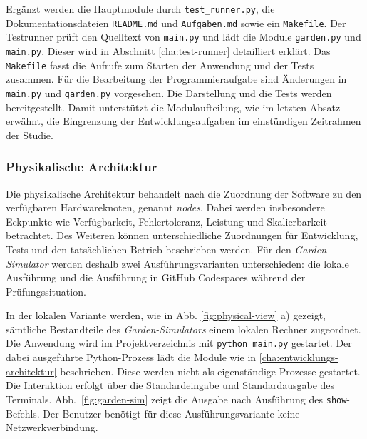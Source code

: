 Ergänzt werden die Hauptmodule durch \texttt{test\_runner.py}, die Dokumentationsdateien \texttt{README.md} und \texttt{Aufgaben.md} sowie ein \texttt{Makefile}. Der Testrunner prüft den Quelltext von \texttt{main.py} und lädt die Module \texttt{garden.py} und \texttt{main.py}. Dieser wird in Abschnitt \ref{cha:test-runner} detailliert erklärt. Das \texttt{Makefile} fasst die Aufrufe zum Starten der Anwendung und der Tests zusammen. Für die Bearbeitung der Programmieraufgabe sind Änderungen in \texttt{main.py} und \texttt{garden.py} vorgesehen. Die Darstellung und die Tests werden bereitgestellt. Damit unterstützt die Modulaufteilung, wie im letzten Absatz erwähnt, die Eingrenzung der Entwicklungsaufgaben im einstündigen Zeitrahmen der Studie.

\subsubsection{Physikalische Architektur}

Die physikalische Architektur behandelt nach \textcite[S.~8]{kruchten_41_1995} die Zuordnung der Software zu den verfügbaren Hardwareknoten, genannt \textit{nodes}. Dabei werden insbesondere Eckpunkte wie Verfügbarkeit, Fehlertoleranz, Leistung und Skalierbarkeit betrachtet. Des Weiteren können unterschiedliche Zuordnungen für Entwicklung, Tests und den tatsächlichen Betrieb beschrieben werden. Für den \textit{Garden-Simulator} werden deshalb zwei Ausführungsvarianten unterschieden: die lokale Ausführung und die Ausführung in GitHub Codespaces während der Prüfungssituation.

In der lokalen Variante werden, wie in Abb. \ref{fig:physical-view} a) gezeigt, sämtliche Bestandteile des \textit{Garden-Simulators} einem lokalen Rechner zugeordnet. Die Anwendung wird im Projektverzeichnis mit \texttt{python main.py} gestartet. Der dabei ausgeführte Python-Prozess lädt die Module wie in \ref{cha:entwicklungs-architektur} beschrieben. Diese werden nicht als eigenständige Prozesse gestartet. Die Interaktion erfolgt über die Standardeingabe und Standardausgabe des Terminals. Abb.~\ref{fig:garden-sim} zeigt die Ausgabe nach Ausführung des \texttt{show}-Befehls. Der Benutzer benötigt für diese Ausführungsvariante keine Netzwerkverbindung.


